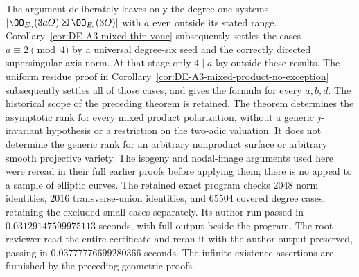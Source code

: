 \begin{remark}
\label{rem:DE-A3-mixed-product-scope}
The argument deliberately leaves only the degree-one systems
$|\OO_{E_{\rm o}}(3aO)\boxtimes\OO_{E_{\rm s}}(3O)|$ with
$a$ even outside its stated range.
Corollary~\ref{cor:DE-A3-mixed-thin-vone} subsequently settles
the cases $a\equiv2\pmod4$ by a universal degree-six seed and
the correctly directed supersingular-axis norm.
At that stage only $4\mid a$ lay outside these results.
The uniform residue proof in
Corollary~\ref{cor:DE-A3-mixed-product-no-exception} subsequently
settles all of those cases, and gives the formula for every $a,b,d$.
The historical scope of the preceding theorem is retained.
The theorem determines the asymptotic
rank for every mixed product polarization, without a generic
$j$-invariant hypothesis or a restriction on the two-adic valuation.
It does not determine the generic rank for an arbitrary
nonproduct surface or arbitrary smooth projective variety.
The isogeny and nodal-image arguments used here were reread in
their full earlier proofs before applying them; there is no
appeal to a sample of elliptic curves.
The retained exact program
checks $2048$ norm identities, $2016$ transverse-union identities,
and $65504$ covered degree cases, retaining the excluded small cases
separately.  Its author run passed in $0.03129147599975113$ seconds,
with full output beside the program.  The root reviewer read the entire
certificate and reran it with the author output preserved, passing in
$0.03777776699280366$ seconds.  The infinite existence assertions
are furnished by the preceding geometric proofs.
\end{remark}
